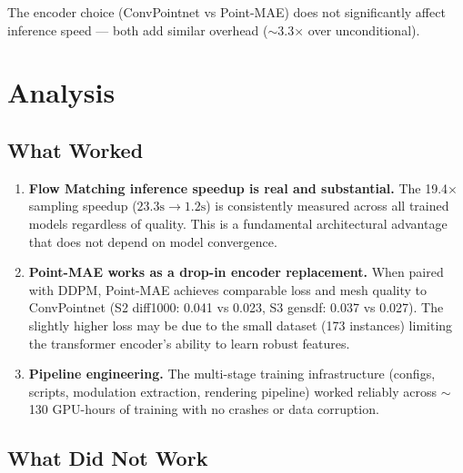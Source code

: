 \documentclass[11pt,letterpaper]{article}
\begin{document}
The encoder choice (ConvPointnet vs Point-MAE) does not significantly affect inference speed --- both add similar overhead (${\sim}$3.3$\times$ over unconditional).

\section{Analysis}

\subsection{What Worked}

\begin{enumerate}
    \item \textbf{Flow Matching inference speedup is real and substantial.} The 19.4$\times$ sampling speedup ($23.3\text{s} \to 1.2\text{s}$) is consistently measured across all trained models regardless of quality. This is a fundamental architectural advantage that does not depend on model convergence.

    \item \textbf{Point-MAE works as a drop-in encoder replacement.} When paired with DDPM, Point-MAE achieves comparable loss and mesh quality to ConvPointnet (S2 diff1000: 0.041 vs 0.023, S3 gensdf: 0.037 vs 0.027). The slightly higher loss may be due to the small dataset (173 instances) limiting the transformer encoder's ability to learn robust features.

    \item \textbf{Pipeline engineering.} The multi-stage training infrastructure (configs, scripts, modulation extraction, rendering pipeline) worked reliably across ${\sim}$130 GPU-hours of training with no crashes or data corruption.
\end{enumerate}

\subsection{What Did Not Work}
\end{document}

